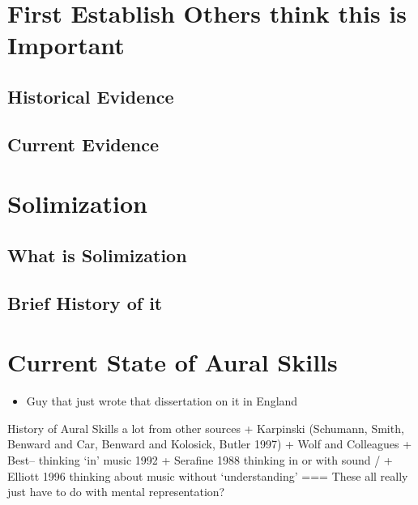 \documentclass[]{book}
\providecommand{\tightlist}{%
  \setlength{\itemsep}{0pt}\setlength{\parskip}{0pt}}
\theoremstyle{definition}
\theoremstyle{definition}
\theoremstyle{definition}
\theoremstyle{remark}
\begin{document}
\hypertarget{first-establish-others-think-this-is-important}{%
\section{First Establish Others think this is
Important}\label{first-establish-others-think-this-is-important}}

\hypertarget{historical-evidence}{%
\subsection{Historical Evidence}\label{historical-evidence}}

\hypertarget{current-evidence}{%
\subsection{Current Evidence}\label{current-evidence}}

\hypertarget{solimization}{%
\section{Solimization}\label{solimization}}

\hypertarget{what-is-solimization}{%
\subsection{What is Solimization}\label{what-is-solimization}}

\hypertarget{brief-history-of-it}{%
\subsection{Brief History of it}\label{brief-history-of-it}}

\hypertarget{current-state-of-aural-skills}{%
\section{Current State of Aural
Skills}\label{current-state-of-aural-skills}}

\begin{itemize}
\tightlist
\item
  Guy that just wrote that dissertation on it in England
\end{itemize}

History of Aural Skills a lot from other sources + Karpinski (Schumann,
Smith, Benward and Car, Benward and Kolosick, Butler 1997) + Wolf and
Colleagues + Best-- thinking `in' music 1992 + Serafine 1988 thinking in
or with sound / + Elliott 1996 thinking about music without
`understanding' === These all really just have to do with mental
representation?
\end{document}

